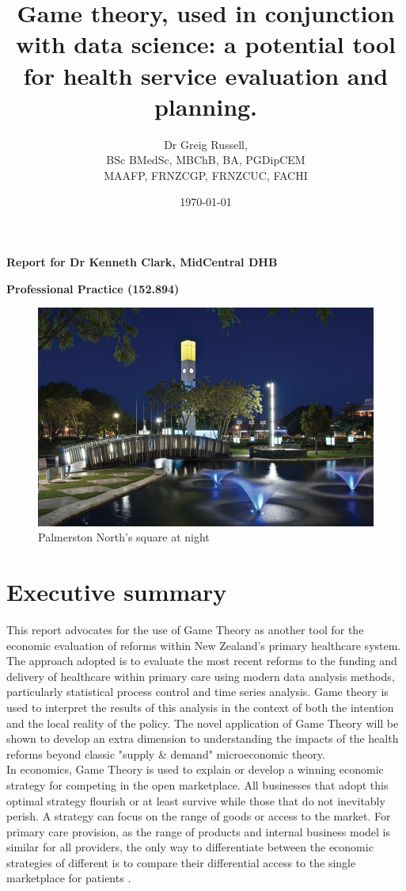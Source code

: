 \documentclass[11pt,a4paper]{article}
\title{\textbf{Game theory, used in conjunction with data science: a potential tool for health service evaluation and planning.}}
\author{Dr Greig Russell, \\ BSc BMedSc, MBChB, BA, PGDipCEM \\ MAAFP, FRNZCGP, FRNZCUC, FACHI}
\date{\today}
\begin{document}
\maketitle

\Large{\textbf{Report for Dr Kenneth Clark, MidCentral DHB}}


\Large{\textbf{Professional Practice (152.894)}}
\newline
\newline
\newline
\begin{figure}[htp]
\centering
\includegraphics[scale=0.6]{PN.png}
\caption{Palmerston North's square at night}
\label{}
\end{figure}


\pagebreak
\section{Executive summary}
This report advocates for the use of Game Theory as another tool for the economic evaluation of reforms within New Zealand's primary healthcare system. The approach adopted is to evaluate the most recent reforms to the funding and delivery of healthcare within primary care using modern data analysis methods, particularly statistical process control and time series analysis. Game theory is used to interpret the results of this analysis in the context of both the intention and the local reality of the policy. The novel application of Game Theory will be shown to develop an extra dimension to understanding the impacts of the health reforms beyond classic "supply \& demand" microeconomic theory.\\


In economics, Game Theory is used to explain or develop a winning economic strategy for competing in the open marketplace. All businesses that adopt this optimal strategy flourish or at least survive while those that do not inevitably perish. A strategy can focus on the range of goods or access to the market. For primary care provision, as the range of products and internal business model is similar for all providers, the only way to differentiate between the economic strategies of different is to compare their differential access to the single marketplace for patients \citep{dinar2008game}. \\
\end{document}
